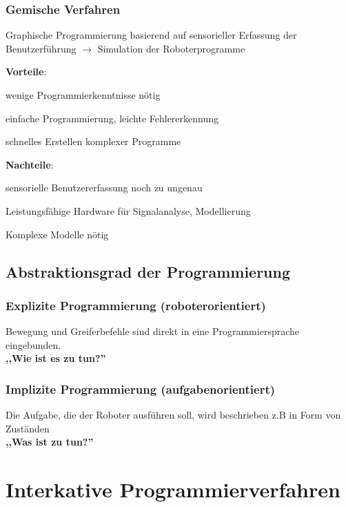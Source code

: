 \subsubsection{Gemische Verfahren}
\begin{compactitem}
    \item Graphische Programmierung basierend auf sensorieller Erfassung der Benutzerführung $\rightarrow$
    Simulation der Roboterprogramme
    \item \textbf{Vorteile}:
    \begin{compactitem}
        \item wenige Programmierkenntnisse nötig
        \item einfache Programmierung, leichte Fehlererkennung
        \item schnelles Erstellen komplexer Programme
    \end{compactitem}
    \item \textbf{Nachteile}:
    \begin{compactitem}
        \item sensorielle Benutzererfassung noch zu ungenau
        \item Leistungsfähige Hardware für Signalanalyse, Modellierung
        \item Komplexe Modelle nötig
    \end{compactitem}
\end{compactitem}
\subsection{Abstraktionsgrad der Programmierung}
\subsubsection{Explizite Programmierung (roboterorientiert)}
Bewegung und Greiferbefehle sind direkt in eine Programmiersprache eingebunden. \\
\textbf{,,Wie ist es zu tun?''}

\subsubsection{Implizite Programmierung (aufgabenorientiert)}
Die Aufgabe, die der Roboter ausführen soll, wird beschrieben z.B in Form von Zuständen \\
\textbf{,,Was ist zu tun?''}
\section{Interkative Programmierverfahren}
